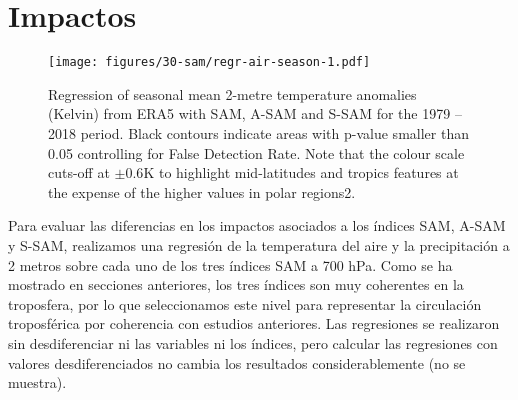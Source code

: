 \documentclass[12pt,oneside]{reedthesis}
\begin{document}
\hypertarget{impacts}{%
\section{Impactos}\label{impacts}}


\begin{figure}
\centering
\texttt{[image: figures/30-sam/regr-air-season-1.pdf]}
\caption{\label{fig:regr-air-season}Regression of seasonal mean 2-metre temperature anomalies (Kelvin) from ERA5 with SAM, A-SAM and S-SAM for the 1979 -- 2018 period. Black contours indicate areas with p-value smaller than 0.05 controlling for False Detection Rate. Note that the colour scale cuts-off at \(\pm0.6 \mathrm{K}\) to highlight mid-latitudes and tropics features at the expense of the higher values in polar regions2.}
\end{figure}
Para evaluar las diferencias en los impactos asociados a los índices SAM, A\nobreakdash-SAM y S\nobreakdash-SAM, realizamos una regresión de la temperatura del aire y la precipitación a 2 metros sobre cada uno de los tres índices SAM a 700 hPa.
Como se ha mostrado en secciones anteriores, los tres índices son muy coherentes en la troposfera, por lo que seleccionamos este nivel para representar la circulación troposférica por coherencia con estudios anteriores.
Las regresiones se realizaron sin desdiferenciar ni las variables ni los índices, pero calcular las regresiones con valores desdiferenciados no cambia los resultados considerablemente (no se muestra).
\end{document}
